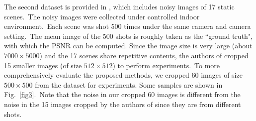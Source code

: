 \documentclass[10pt,twocolumn,letterpaper]{article}
\begin{document}
The second dataset is provided in \cite{crosschannel2016}, which includes noisy images of 17 static scenes.\ The noisy images were collected under controlled indoor environment.\ Each scene was shot 500 times under the same camera and camera setting.\ The mean image of the 500 shots is roughly taken as the ``ground truth", with which the PSNR can be computed. Since the image size is very large (about $7000\times5000$) and the 17 scenes share repetitive contents, the authors of \cite{crosschannel2016} cropped 15 smaller images (of size $512\times512$) to perform experiments.\ To more comprehensively evaluate the proposed methods, we cropped 60 images of size $500\times500$ from the dataset for experiments. Some samples are shown in Fig.\ \ref{fig3}.\ Note that the noise in our cropped 60 images is different from the noise in the 15 images cropped by the authors of \cite{crosschannel2016} since they are from different shots.
\end{document}
